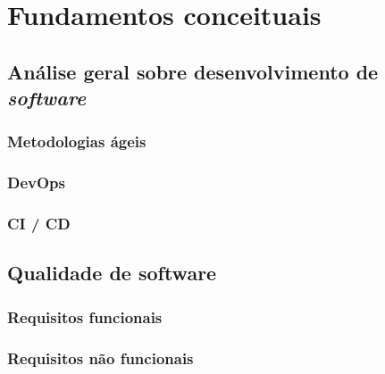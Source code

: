 \documentclass[]{../class/politex}
\begin{document}
  \capa
  \falsafolhaderosto
  \folhaderosto

  \begin{resumo}
  \end{resumo}

  \begin{abstract}
  \end{abstract}

  \listadefiguras

  \listadetabelas

  \sumario

  

  

  

  \chapter{Fundamentos conceituais}

    \section{Análise geral sobre desenvolvimento de \textit{software}}

      \subsection{Metodologias ágeis}

      \subsection{DevOps}

      \subsection{CI / CD}

    \section{Qualidade de software}

      \subsection{Requisitos funcionais}

      \subsection{Requisitos não funcionais}
\end{document}
